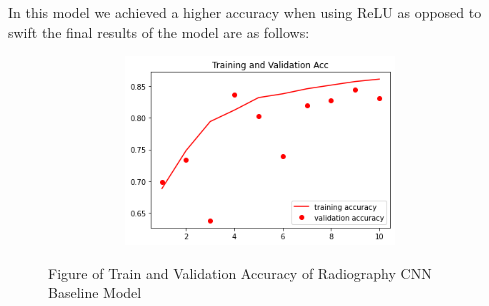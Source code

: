     \begin{table}[H]
    \centering
    \caption{Radiography CNN baseline model hyperparameters}
    \label{tab:Radiography CNN baseline model hyperparameters}
\end{table}
In this model we achieved a higher accuracy when using ReLU as opposed to swift the final results of the model are as follows:
\begin{table}[H]
    \centering
    \caption{Radiography CNN baseline results}
    \label{tab:Radiography CNN baseline results}
\end{table}
 \begin{figure}[H]
    \centering
    \includegraphics[width=1\textwidth,height=5cm,keepaspectratio]{Images/RadiographyCNNBaselineTrainAndValAcc.png}\\
    \caption{Figure of Train and Validation Accuracy of Radiography CNN Baseline Model}
    \label{fig:Radiography CNN Baseline Train and Validation Accuracy}
\end{figure}
